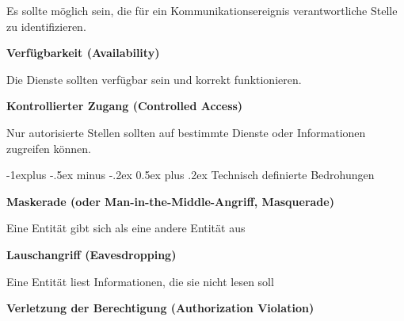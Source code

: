 \documentclass[a4paper]{article}
\makeatletter
\renewcommand{\subsection}{\@startsection{subsection}{2}{0mm}%
 {-1explus -.5ex minus -.2ex}%
 {0.5ex plus .2ex}%
 {\normalfont\normalsize\bfseries}}
\makeatother
\begin{document}
\begin{multicols}{3}
\begin{itemize*}
            \begin{itemize*}
                  \item Es sollte möglich sein, die für ein Kommunikationsereignis verantwortliche Stelle zu identifizieren.
            \end{itemize*}
            \item
            \textbf{Verfügbarkeit (Availability)}

            \begin{itemize*}
                  \item Die Dienste sollten verfügbar sein und korrekt funktionieren.
            \end{itemize*}
            \item
            \textbf{Kontrollierter Zugang (Controlled Access)}

            \begin{itemize*}
                  \item Nur autorisierte Stellen sollten auf bestimmte Dienste oder Informationen zugreifen können.
            \end{itemize*}
      \end{itemize*}


      \subsection{Technisch definierte
            Bedrohungen}

      \begin{itemize*}
            \item
            \textbf{Maskerade (oder Man-in-the-Middle-Angriff, Masquerade)}

            \begin{itemize*}
                  \item Eine Entität gibt sich als eine andere Entität aus
            \end{itemize*}
            \item
            \textbf{Lauschangriff (Eavesdropping)}

            \begin{itemize*}
                  \item Eine Entität liest Informationen, die sie nicht lesen soll
            \end{itemize*}
            \item
            \textbf{Verletzung der Berechtigung (Authorization Violation)}


\end{itemize*}
\end{multicols}
\end{document}
